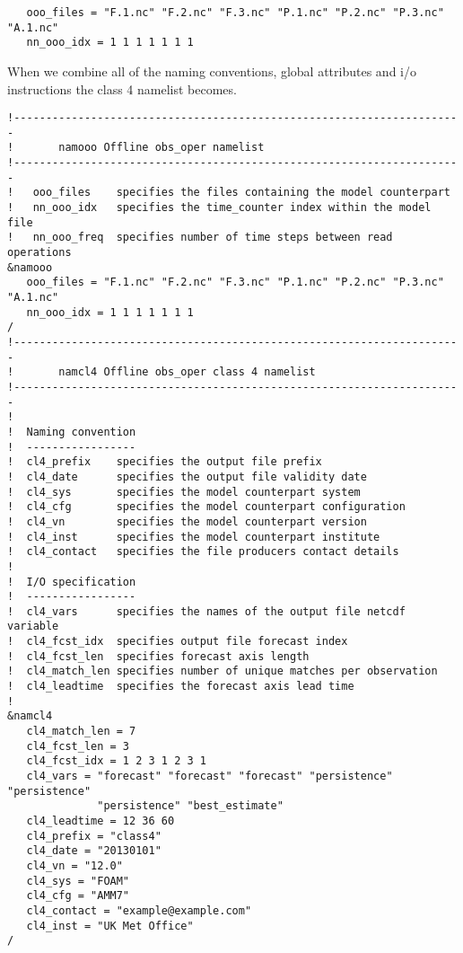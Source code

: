 \documentclass[NEMO_book]{subfiles}
\begin{document}
\begin{alltt}
\tiny
\begin{verbatim}
   ooo_files = "F.1.nc" "F.2.nc" "F.3.nc" "P.1.nc" "P.2.nc" "P.3.nc" "A.1.nc"
   nn_ooo_idx = 1 1 1 1 1 1 1
\end{verbatim}
\end{alltt}

When we combine all of the naming conventions, global attributes and i/o instructions
the class 4 namelist becomes.

\begin{alltt}
\tiny
\begin{verbatim}
!----------------------------------------------------------------------
!       namooo Offline obs_oper namelist
!----------------------------------------------------------------------
!   ooo_files    specifies the files containing the model counterpart
!   nn_ooo_idx   specifies the time_counter index within the model file
!   nn_ooo_freq  specifies number of time steps between read operations
&namooo
   ooo_files = "F.1.nc" "F.2.nc" "F.3.nc" "P.1.nc" "P.2.nc" "P.3.nc" "A.1.nc"
   nn_ooo_idx = 1 1 1 1 1 1 1
/
!----------------------------------------------------------------------
!       namcl4 Offline obs_oper class 4 namelist
!----------------------------------------------------------------------
!
!  Naming convention
!  -----------------
!  cl4_prefix    specifies the output file prefix
!  cl4_date      specifies the output file validity date
!  cl4_sys       specifies the model counterpart system
!  cl4_cfg       specifies the model counterpart configuration
!  cl4_vn        specifies the model counterpart version
!  cl4_inst      specifies the model counterpart institute
!  cl4_contact   specifies the file producers contact details
!
!  I/O specification
!  -----------------
!  cl4_vars      specifies the names of the output file netcdf variable
!  cl4_fcst_idx  specifies output file forecast index
!  cl4_fcst_len  specifies forecast axis length
!  cl4_match_len specifies number of unique matches per observation
!  cl4_leadtime  specifies the forecast axis lead time 
!
&namcl4
   cl4_match_len = 7
   cl4_fcst_len = 3
   cl4_fcst_idx = 1 2 3 1 2 3 1
   cl4_vars = "forecast" "forecast" "forecast" "persistence" "persistence"
              "persistence" "best_estimate"
   cl4_leadtime = 12 36 60
   cl4_prefix = "class4"
   cl4_date = "20130101"
   cl4_vn = "12.0"
   cl4_sys = "FOAM"
   cl4_cfg = "AMM7"
   cl4_contact = "example@example.com"
   cl4_inst = "UK Met Office"
/
\end{verbatim}
\end{alltt}
\end{document}
